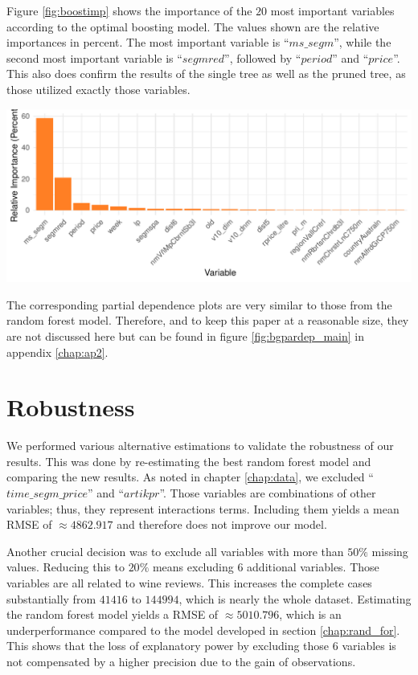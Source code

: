 \documentclass[11pt,]{article}
\let\origfigure\figure
\let\endorigfigure\endfigure
\renewenvironment{figure}[1][2] {
    \expandafter\origfigure\expandafter[H]
} {
    \endorigfigure
}
\begin{document}
Figure \ref{fig:boostimp} shows the importance of the \(20\) most
important variables according to the optimal boosting model. The values
shown are the relative importances in percent. The most important
variable is \enquote{\(ms\_segm\)}, while the second most important
variable is \enquote{\(segmred\)}, followed by \enquote{\(period\)} and
\enquote{\(price\)}. This also does confirm the results of the single
tree as well as the pruned tree, as those utilized exactly those
variables.

\begin{figure}
\centering
\includegraphics{../00_data/output_paper/12_var_imp_boosting_bp.pdf}
\caption{\label{fig:boostimp}Boosting: Variable Importance Plot.}
\end{figure}

The corresponding partial dependence plots are very similar to those
from the random forest model. Therefore, and to keep this paper at a
reasonable size, they are not discussed here but can be found in figure
\ref{fig:bgpardep_main} in appendix \ref{chap:ap2}.

\hypertarget{robustness}{%
\section{\texorpdfstring{Robustness
\label{chap:rob}}{Robustness }}\label{robustness}}

We performed various alternative estimations to validate the robustness
of our results. This was done by re-estimating the best random forest
model and comparing the new results. As noted in chapter
\ref{chap:data}, we excluded \enquote{\(time\_segm\_price\)} and
\enquote{\(artikpr\)}. Those variables are combinations of other
variables; thus, they represent interactions terms. Including them
yields a mean \ac{RMSE} of \(\approx4862.917\) and therefore does not
improve our model.

Another crucial decision was to exclude all variables with more than
\(50\%\) missing values. Reducing this to \(20\%\) means excluding \(6\)
additional variables. Those variables are all related to wine reviews.
This increases the complete cases substantially from \(41416\) to
\(144994\), which is nearly the whole dataset. Estimating the random
forest model yields a \ac{RMSE} of \(\approx5010.796\), which is an
underperformance compared to the model developed in section
\ref{chap:rand_for}. This shows that the loss of explanatory power by
excluding those \(6\) variables is not compensated by a higher precision
due to the gain of observations.
\end{document}
